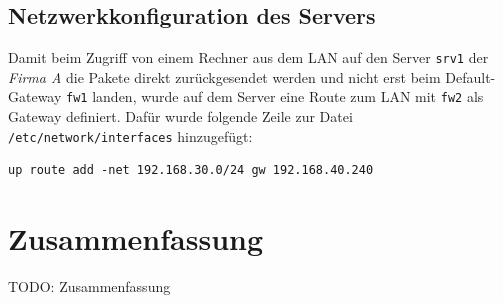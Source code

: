 \subsection{Netzwerkkonfiguration des Servers}

Damit beim Zugriff von einem Rechner aus dem LAN auf den Server
{\tt srv1} der \emph{Firma A} die Pakete direkt zurückgesendet werden und nicht
erst beim Default-Gateway {\tt fw1} landen, wurde auf dem
Server eine Route zum LAN mit {\tt fw2} als Gateway definiert.
Dafür wurde folgende Zeile zur Datei {\tt /etc/network/interfaces} hinzugefügt:
\begin{verbatim}
up route add -net 192.168.30.0/24 gw 192.168.40.240
\end{verbatim}


\section{Zusammenfassung}

TODO: Zusammenfassung

